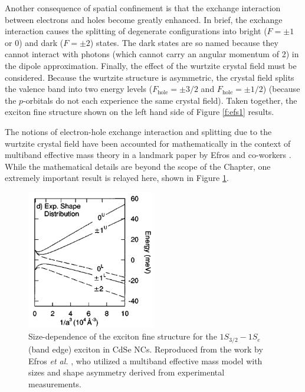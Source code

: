 Another consequence of spatial confinement is that the exchange interaction between electrons and holes become greatly enhanced. In brief, the exchange interaction causes the splitting of degenerate configurations into bright ($F = \pm1$ or $0$) and dark ($F = \pm2$) states. The dark states are so named because they cannot interact with photons (which cannot carry an angular momentum of 2) in the dipole approximation. Finally, the effect of the wurtzite crystal field must be considered. Because the wurtzite structure is asymmetric, the crystal field splits the valence band into two energy levels ($F_{\mathrm{hole}} = \pm3/2$ and $F_{\mathrm{hole}} = \pm1/2$) (because the $p$-orbitals do not each experience the same crystal field). Taken together, the exciton fine structure shown on the left hand side of Figure \ref{f:efs1} results. \par

The notions of electron-hole exchange interaction and splitting due to the wurtzite crystal field have been accounted for mathematically in the context of multiband effective mass theory in a landmark paper by Efros and co-workers \cite{PhysRevB.54.4843}. While the mathematical details are beyond the scope of the Chapter, one extremely important result is relayed here, shown in Figure \ref{f:efs2}. 

\begin{figure}
\begin{center}
\includegraphics[width=0.5\textwidth]{./Chapter1/efs_efros.png}
\caption[Size-dependence of exciton fine structure in CdSe nanocrystals.]{Size-dependence of the exciton fine structure for the $1S_{3/2}-1S_e$ (band edge) exciton in CdSe NCs. Reproduced from the work by Efros \emph{et al.} \cite{PhysRevB.54.4843}, who utilized a multiband effective mass model with sizes and shape asymmetry derived from experimental measurements.}
\label{f:efs2}
\end{center}
\end{figure}

